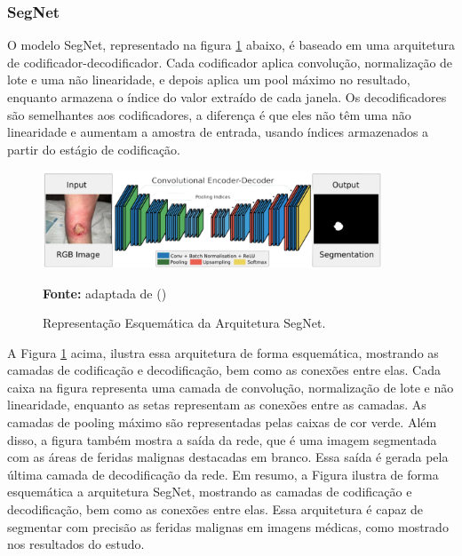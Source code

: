     
    \subsubsection{SegNet}

        O modelo \ac{SegNet}, representado na figura \ref{fig:arquiteturaSegNet} abaixo,  é baseado em uma arquitetura de codificador-decodificador. Cada codificador aplica convolução, normalização de lote e uma não linearidade, e depois aplica um pool máximo no resultado, enquanto armazena o índice do valor extraído de cada janela. Os decodificadores são semelhantes aos codificadores, a diferença é que eles não têm uma não linearidade e aumentam a amostra de entrada, usando índices armazenados a partir do estágio de codificação.

        \begin{figure}[htbp]
            \centering
            \caption{Representação Esquemática da Arquitetura \ac{SegNet}.}
            \includegraphics[width=0.9\textwidth]{img/arquitetura_Seg-Net.png}
            \label{fig:arquiteturaSegNet}
            \par\medskip\textbf{Fonte:} adaptada de (\cite{badrinarayanan2017deep})
        \end{figure}
        
        \clearpage

            A Figura \ref{fig:arquiteturaSegNet} acima, ilustra essa arquitetura de forma esquemática, mostrando as camadas de codificação e decodificação, bem como as conexões entre elas. Cada caixa na figura representa uma camada de convolução, normalização de lote e não linearidade, enquanto as setas representam as conexões entre as camadas. As camadas de pooling máximo são representadas pelas caixas de cor verde. Além disso, a figura também mostra a saída da rede, que é uma imagem segmentada com as áreas de feridas malignas destacadas em branco. Essa saída é gerada pela última camada de decodificação da rede.
            Em resumo, a Figura ilustra de forma esquemática a arquitetura \ac{SegNet}, mostrando as camadas de codificação e decodificação, bem como as conexões entre elas. Essa arquitetura é capaz de segmentar com precisão as feridas malignas em imagens médicas, como mostrado nos resultados do estudo.

